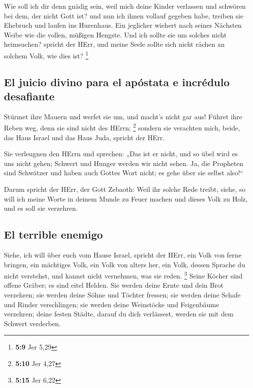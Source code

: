  Wie soll ich dir denn gnädig sein, weil mich deine Kinder
verlassen und schwören bei dem, der nicht Gott ist? und nun ich ihnen
vollauf gegeben habe, treiben sie Ehebruch und laufen ins Hurenhaus.
 Ein jeglicher wiehert nach seines Nächsten Weibe wie die
vollen, müßigen Hengste.  Und ich sollte sie um solches
nicht heimsuchen? spricht der HErr, und meine Seele sollte sich nicht
rächen an solchem Volk, wie dies ist? \footnote{\textbf{5:9} Jer 5,29}

\hypertarget{el-juicio-divino-para-el-apuxf3stata-e-incruxe9dulo-desafiante}{%
\subsection{El juicio divino para el apóstata e incrédulo
desafiante}\label{el-juicio-divino-para-el-apuxf3stata-e-incruxe9dulo-desafiante}}

 Stürmet ihre Mauern und werfet sie um, und macht's nicht
gar aus! Führet ihre Reben weg, denn sie sind nicht des HErrn;
\footnote{\textbf{5:10} Jer 4,27}  sondern sie verachten
mich, beide, das Haus Israel und das Haus Juda, spricht der HErr.

 Sie verleugnen den HErrn und sprechen: „Das ist er
nicht, und so übel wird es uns nicht gehen; Schwert und Hunger werden
wir nicht sehen.  Ja, die Propheten sind Schwätzer und
haben auch Gottes Wort nicht; es gehe über sie selbst also!{}``

 Darum spricht der HErr, der Gott Zebaoth: Weil ihr
solche Rede treibt, siehe, so will ich meine Worte in deinem Munde zu
Feuer machen und dieses Volk zu Holz, und es soll sie verzehren.

\hypertarget{el-terrible-enemigo}{%
\subsection{El terrible enemigo}\label{el-terrible-enemigo}}

 Siehe, ich will über euch vom Hause Israel, spricht der
HErr, ein Volk von ferne bringen, ein mächtiges Volk, ein Volk von
alters her, ein Volk, dessen Sprache du nicht verstehst, und kannst
nicht vernehmen, was sie reden. \footnote{\textbf{5:15} Jer 6,22}
 Seine Köcher sind offene Gräber; es sind eitel Helden.
 Sie werden deine Ernte und dein Brot verzehren; sie
werden deine Söhne und Töchter fressen; sie werden deine Schafe und
Rinder verschlingen; sie werden deine Weinstöcke und Feigenbäume
verzehren; deine festen Städte, darauf du dich verlässest, werden sie
mit dem Schwert verderben.

